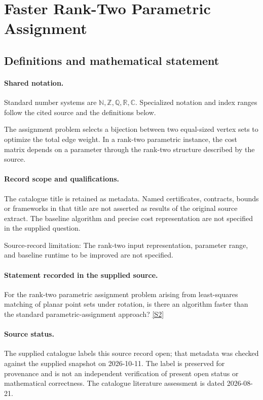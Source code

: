 \documentclass[11pt]{article}
\newcommand{\sref}[2]{\hyperlink{source:#1:#2}{[S#2]}}
\begin{document}
\section{Faster Rank-Two Parametric Assignment}\label{statement}

\subsection{Definitions and mathematical statement}

\paragraph{Shared notation.}Standard number systems are $\mathbb N,\mathbb Z,\mathbb Q,\mathbb R,\mathbb C$. Specialized notation and index ranges follow the cited source and the definitions below.


The assignment problem selects a bijection between two equal-sized vertex sets to optimize the total edge weight. In a rank-two parametric instance, the cost matrix depends on a parameter through the rank-two structure described by the source.
\paragraph{Record scope and qualifications.}
The catalogue title is retained as metadata. Named certificates, contracts, bounds or frameworks in that title are not asserted as results of the original source extract.
The baseline algorithm and precise cost representation are not specified in the supplied question.

Source-record limitation: The rank-two input representation, parameter range, and baseline runtime to be improved are not specified.
\paragraph{Statement recorded in the supplied source.}
For the rank-two parametric assignment problem arising from least-squares matching of planar point sets under rotation, is there an algorithm faster than the standard parametric-assignment approach? \sref{statement}{2}
\paragraph{Source status.}
The supplied catalogue labels this source record open; that metadata was checked against the supplied snapshot on 2026-10-11. The label is preserved for provenance and is not an independent verification of present open status or mathematical correctness. The catalogue literature assessment is dated 2026-08-21.
\end{document}
